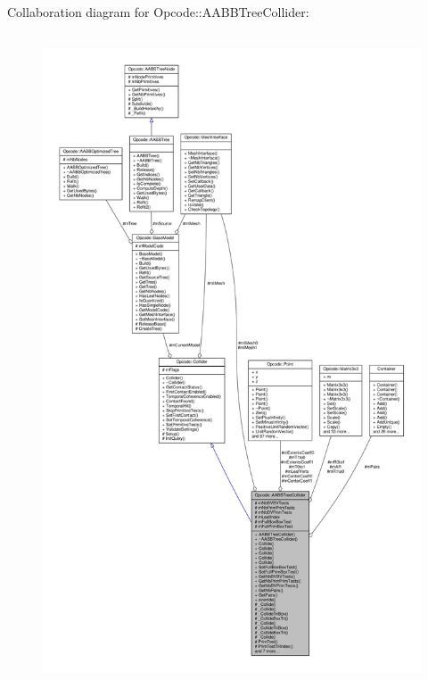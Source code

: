 Collaboration diagram for Opcode\+:\+:A\+A\+B\+B\+Tree\+Collider\+:
\nopagebreak
\begin{figure}[H]
\begin{center}
\leavevmode
\includegraphics[height=550pt]{d3/d08/classOpcode_1_1AABBTreeCollider__coll__graph}
\end{center}
\end{figure}
